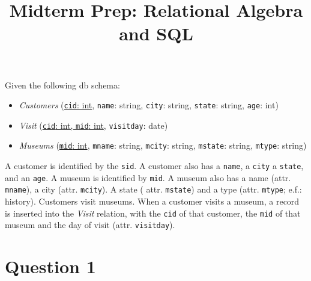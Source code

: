 \documentclass[letterpaper, 11pt]{article}
\title{Midterm Prep: Relational Algebra and SQL}
\author{}
\date{}
\begin{document}
\maketitle

\vspace{-4em}

Given the following db schema:
\begin{itemize}
    \item \textit{Customers} (\underline{\texttt{cid}: int}, \texttt{name}: string, \texttt{city}: string, \texttt{state}: string, \texttt{age}: int)
    \item \textit{Visit} (\underline{\texttt{cid}: int, \texttt{mid}: int}, \texttt{visitday}: date)
    \item \textit{Museums} (\underline{\texttt{mid}: int}, \texttt{mname}: string, \texttt{mcity}: string, \texttt{mstate}: string, \texttt{mtype}: string) 
\end{itemize}

A customer is identified by the \texttt{sid}. A customer also has a \texttt{name}, a \texttt{city} a \texttt{state}, and an \texttt{age}. A museum is identified by \texttt{mid}. A museum also has a name (attr. \texttt{mname}), a city (attr. \texttt{mcity}). A state ( attr. \texttt{mstate}) and a type (attr. \texttt{mtype}; e.f.: history). Customers visit museums. When a customer visits a museum, a record is inserted into the \textit{Visit} relation, with the \texttt{cid} of that customer, the \texttt{mid} of that museum and the day of visit (attr. \texttt{visitday}).

\section*{Question 1}
\end{document}
